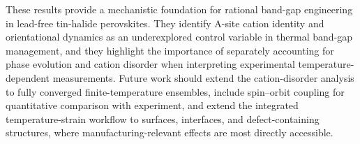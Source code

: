 These results provide a mechanistic foundation for rational
band-gap engineering in lead-free tin-halide perovskites.
They identify A-site cation identity and orientational dynamics as
an underexplored control variable in thermal band-gap management,
and they highlight the importance of separately accounting for
phase evolution and cation disorder when interpreting experimental
temperature-dependent measurements.
Future work should extend the cation-disorder analysis to fully
converged finite-temperature ensembles, include spin--orbit coupling
for quantitative comparison with experiment, and extend the integrated
temperature-strain workflow to surfaces, interfaces, and
defect-containing structures, where manufacturing-relevant effects
are most directly accessible.